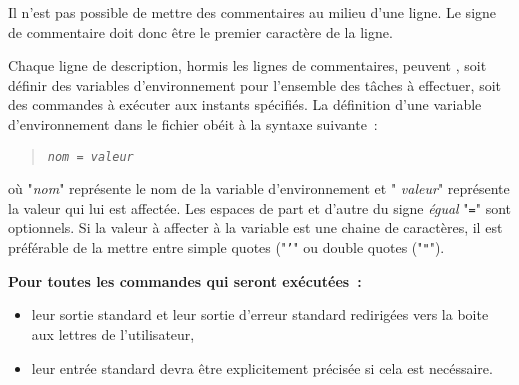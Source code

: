 \begin{remarque}
Il n'est pas possible de mettre des commentaires au milieu d'une ligne. Le signe de
commentaire doit donc {\^e}tre le premier caract{\`e}re de la ligne.
\end{remarque}

Chaque ligne de description, hormis les lignes de commentaires, peuvent , soit
d{\'e}finir des variables d'environnement pour l'ensemble des t{\^a}ches {\`a} effectuer,
soit des commandes {\`a} ex{\'e}cuter aux instants sp{\'e}cifi{\'e}s. La d{\'e}finition d'une
variable d'environnement dans le fichier ob{\'e}it {\`a} la syntaxe suivante~:
\begin{quote}
{\tt {\sl nom} = {\sl valeur}}
\end{quote}
o{\`u} "{\sl nom}" repr{\'e}sente le nom de la variable d'environnement et "{\sl
valeur}" repr{\'e}sente la valeur qui lui est affect{\'e}e. Les espaces de part et
d'autre du signe {\sl {\'e}gual} "{\tt =}" sont optionnels. Si la valeur {\`a}
affecter {\`a} la variable est une chaine de caract{\`e}res, il est pr{\'e}f{\'e}rable de la
mettre entre simple quotes ("{\tt '}" ou double quotes ("\verb="=").

{\bf Pour toutes les commandes qui seront ex{\'e}cut{\'e}es~:
\begin{itemize}
	\item	leur sortie standard et leur sortie d'erreur standard redirig{\'e}es vers
			la boite aux lettres de l'utilisateur,
	\item	leur entr{\'e}e standard devra {\^e}tre explicitement pr{\'e}cis{\'e}e si cela est
			nec{\'e}ssaire.
\end{itemize}
}

